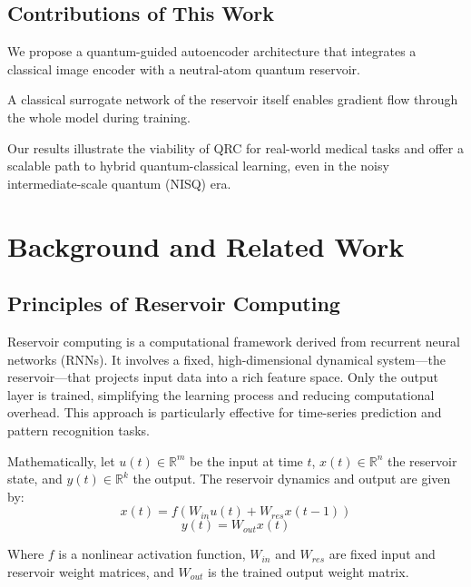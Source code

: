 \documentclass[conference]{IEEEtran}
\begin{document}
\subsection{Contributions of This Work}
We propose a quantum-guided autoencoder architecture that 
integrates a classical image encoder with a neutral-atom
quantum reservoir.

A classical surrogate network of the reservoir itself enables 
gradient flow through the whole model during training.

Our results illustrate the viability of QRC for real-world medical 
tasks and offer a scalable path to hybrid quantum-classical learning,
even in the noisy intermediate-scale quantum (NISQ) era.


\section{Background and Related Work}

\subsection{Principles of Reservoir Computing}
Reservoir computing is a computational framework 
derived from recurrent neural networks (RNNs). It 
involves a fixed, high-dimensional dynamical system—the 
reservoir—that projects input data into a rich feature 
space. Only the output layer is trained, simplifying 
the learning process and reducing computational 
overhead. This approach is particularly effective 
for time-series prediction and pattern recognition tasks.

Mathematically, let \( u(t) \in \mathbb{R}^m \) be the input at time \( t \),
\( x(t) \in \mathbb{R}^n \) the reservoir state, and
\( y(t) \in \mathbb{R}^k \) the output. The reservoir dynamics
and output are given by:
\begin{equation}
    x(t) = f(W_{in} u(t) + W_{res} x(t-1))
\end{equation}
\begin{equation}
    y(t) = W_{out} x(t)
\end{equation}


Where \( f \) is a nonlinear activation function,
\( W_{in} \) and \( W_{res} \) are fixed input and reservoir weight matrices, 
and \( W_{out} \) is the trained output weight matrix.
\end{document}
